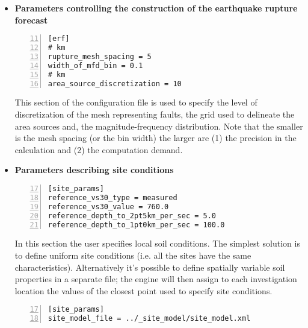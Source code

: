 \begin{itemize}
    In the second option all the possible realizations are created. 
    Below we provide an example for the latter option.
    In this case we set the \texttt{number\-\_of\-\_logic\_tree\_samples}
    to 0. \gls{acr:oqe} will perform a complete enumeration of all 
    the possible paths from the roots to the leaves of the logic tree 
    structure.
\begin{Verbatim}[frame=single, commandchars=\\\{\}, fontsize=\small,
    firstnumber=9, numbers=left, numbersep=2pt]
[logic_tree]
number_of_logic_tree_samples = 0
\end{Verbatim}
    If the seismic source logic tree and the ground motion
    logic tree do not contain epistemic uncertainties the engine will
    create a single PSHA input.
%
\item \textbf{Parameters controlling the construction of the earthquake 
    rupture forecast}
\begin{Verbatim}[frame=single, commandchars=\\\{\}, fontsize=\small,
    firstnumber=11, numbers=left, numbersep=2pt]
[erf]
# km
rupture_mesh_spacing = 5
width_of_mfd_bin = 0.1
# km
area_source_discretization = 10
\end{Verbatim}
This section of the configuration file is used to specify the 
level of discretization of the mesh representing faults, the grid
used to delineate the area sources and, the magnitude-frequency 
distribution. Note that the smaller is the mesh spacing (or the bin width) the larger 
are (1) the precision in the calculation and (2) the computation demand.
%
\item \textbf{Parameters describing site conditions}
\begin{Verbatim}[frame=single, commandchars=\\\{\}, fontsize=\small,
    firstnumber=17, numbers=left, numbersep=2pt]
[site_params]
reference_vs30_type = measured
reference_vs30_value = 760.0
reference_depth_to_2pt5km_per_sec = 5.0
reference_depth_to_1pt0km_per_sec = 100.0
\end{Verbatim}
In this section the user specifies local soil conditions. The simplest
solution is to define uniform site conditions (i.e. all the sites have 
the same characteristics). Alternatively it's possible to define 
spatially variable soil properties in a separate file; the engine will
then assign to each investigation location the values of the closest point
used to specify site conditions.
%
\begin{Verbatim}[frame=single, commandchars=\\\{\}, fontsize=\small,
    firstnumber=17, numbers=left, numbersep=2pt]
[site_params]
site_model_file = ../_site_model/site_model.xml
\end{Verbatim}


\end{itemize}
